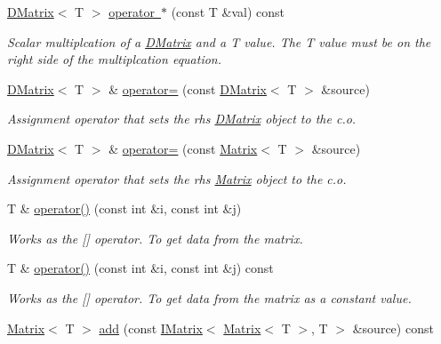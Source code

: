 \begin{DoxyCompactItemize}
\mbox{\hyperlink{class_d_matrix}{D\+Matrix}}$<$ T $>$ \mbox{\hyperlink{class_d_matrix_a75ef39fe66d72426b7a84b91bfc136c4}{operator $\ast$}} (const T \&val) const
\begin{DoxyCompactList}\small\item\em Scalar multiplcation of a \mbox{\hyperlink{class_d_matrix}{D\+Matrix}} and a T value. The T value must be on the right side of the multiplcation equation. \end{DoxyCompactList}\item 
\mbox{\hyperlink{class_d_matrix}{D\+Matrix}}$<$ T $>$ \& \mbox{\hyperlink{class_d_matrix_a36f86365c4ee760200acc4abfc5b27f2}{operator=}} (const \mbox{\hyperlink{class_d_matrix}{D\+Matrix}}$<$ T $>$ \&source)
\begin{DoxyCompactList}\small\item\em Assignment operator that sets the rhs \mbox{\hyperlink{class_d_matrix}{D\+Matrix}} object to the c.\+o. \end{DoxyCompactList}\item 
\mbox{\hyperlink{class_d_matrix}{D\+Matrix}}$<$ T $>$ \& \mbox{\hyperlink{class_d_matrix_aee2b82126e42d54f74f7076c998b3c8d}{operator=}} (const \mbox{\hyperlink{class_matrix}{Matrix}}$<$ T $>$ \&source)
\begin{DoxyCompactList}\small\item\em Assignment operator that sets the rhs \mbox{\hyperlink{class_matrix}{Matrix}} object to the c.\+o. \end{DoxyCompactList}\item 
T \& \mbox{\hyperlink{class_d_matrix_a4dc37695c56a6c4917159877d2aa3d81}{operator()}} (const int \&i, const int \&j)
\begin{DoxyCompactList}\small\item\em Works as the \mbox{[}\mbox{]} operator. To get data from the matrix. \end{DoxyCompactList}\item 
T \& \mbox{\hyperlink{class_d_matrix_a001f8f4ec1a2152ad5fe770072b6609d}{operator()}} (const int \&i, const int \&j) const
\begin{DoxyCompactList}\small\item\em Works as the \mbox{[}\mbox{]} operator. To get data from the matrix as a constant value. \end{DoxyCompactList}\item 
\mbox{\hyperlink{class_matrix}{Matrix}}$<$ T $>$ \mbox{\hyperlink{class_d_matrix_a8b296d73c991f28ca2af94d36cc006c9}{add}} (const \mbox{\hyperlink{class_i_matrix}{I\+Matrix}}$<$ \mbox{\hyperlink{class_matrix}{Matrix}}$<$ T $>$, T $>$ \&source) const

\end{DoxyCompactItemize}
